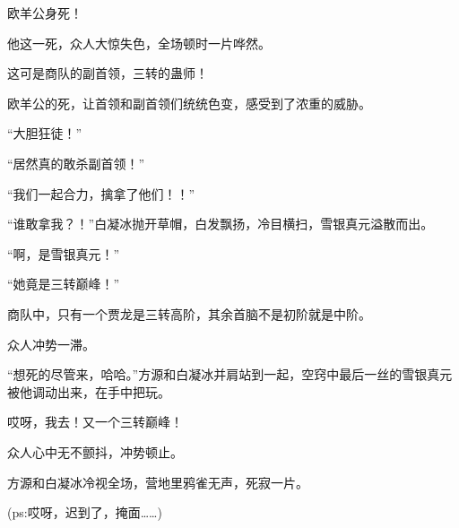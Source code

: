 \begin{this_body}
欧羊公身死！

他这一死，众人大惊失色，全场顿时一片哗然。

这可是商队的副首领，三转的蛊师！

欧羊公的死，让首领和副首领们统统色变，感受到了浓重的威胁。

“大胆狂徒！”

“居然真的敢杀副首领！”

“我们一起合力，擒拿了他们！！”

“谁敢拿我？！”白凝冰抛开草帽，白发飘扬，冷目横扫，雪银真元溢散而出。

“啊，是雪银真元！”

“她竟是三转巅峰！”

商队中，只有一个贾龙是三转高阶，其余首脑不是初阶就是中阶。

众人冲势一滞。

“想死的尽管来，哈哈。”方源和白凝冰并肩站到一起，空窍中最后一丝的雪银真元被他调动出来，在手中把玩。

哎呀，我去！又一个三转巅峰！

众人心中无不颤抖，冲势顿止。

方源和白凝冰冷视全场，营地里鸦雀无声，死寂一片。

(ps:哎呀，迟到了，掩面……)

\end{this_body}

